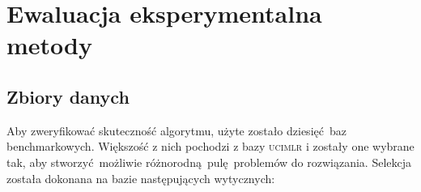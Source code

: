 \documentclass[]{article}
\begin{document}

\section{Ewaluacja eksperymentalna metody}

\subsection{Zbiory danych}

Aby zweryfikować skuteczność algorytmu, użyte zostało dziesięć baz benchmarkowych. Większość z nich pochodzi z bazy \textsc{ucimlr}\cite{asuncion2007uci} i zostały one wybrane tak, aby stworzyć możliwie różnorodną pulę problemów do rozwiązania. Selekcja została dokonana na bazie następujących wytycznych:
\end{document}
